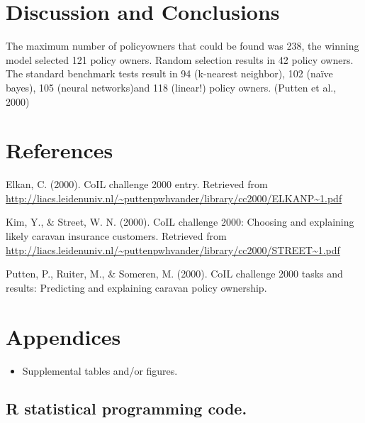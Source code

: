\documentclass[man]{apa6}
\providecommand{\tightlist}{%
  \setlength{\itemsep}{0pt}\setlength{\parskip}{0pt}}
\begin{document}
\hypertarget{discussion-and-conclusions}{%
\section{Discussion and Conclusions}\label{discussion-and-conclusions}}

The maximum number of policyowners that could be found was 238, the winning model selected 121 policy owners. Random selection results in 42 policy owners. The standard benchmark tests result in 94 (k-nearest neighbor), 102 (naïve bayes), 105 (neural networks)and 118 (linear!) policy owners. (Putten et al., 2000)

\newpage

\hypertarget{references}{%
\section{References}\label{references}}

\begingroup
\setlength{\parindent}{-0.5in}
\setlength{\leftskip}{0.5in}

\hypertarget{refs}{}
\leavevmode\hypertarget{ref-Elkan}{}%
Elkan, C. (2000). CoIL challenge 2000 entry. Retrieved from \url{http://liacs.leidenuniv.nl/~puttenpwhvander/library/cc2000/ELKANP~1.pdf}

\leavevmode\hypertarget{ref-Kim}{}%
Kim, Y., \& Street, W. N. (2000). CoIL challenge 2000: Choosing and explaining likely caravan insurance customers. Retrieved from \url{http://liacs.leidenuniv.nl/~puttenpwhvander/library/cc2000/STREET~1.pdf}

\leavevmode\hypertarget{ref-Putten}{}%
Putten, P., Ruiter, M., \& Someren, M. (2000). CoIL challenge 2000 tasks and results: Predicting and explaining caravan policy ownership.

\endgroup

\newpage

\hypertarget{appendices}{%
\section{Appendices}\label{appendices}}

\begin{itemize}
\tightlist
\item
  Supplemental tables and/or figures.
\end{itemize}

\hypertarget{r-statistical-programming-code.}{%
\subsection{R statistical programming code.}\label{r-statistical-programming-code.}}
\end{document}
